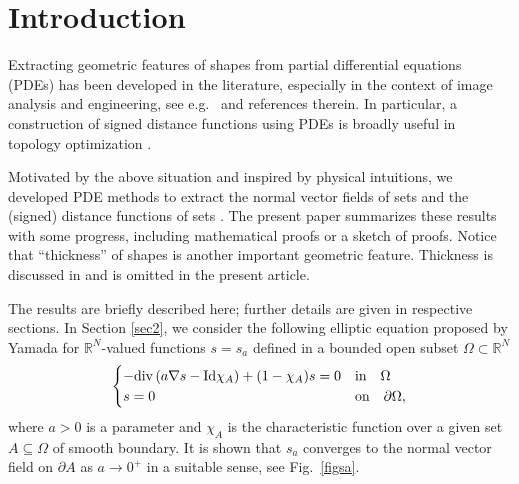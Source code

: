 \documentclass[graybox]{svmult}
\newcommand{\R}{\mathbb{R}}  %
\renewcommand{\AA}{A}  %
\renewcommand{\div}{\mathrm{div}} %
\begin{document}
\section{Introduction}
\label{sec:1}



Extracting geometric features of shapes from partial differential equations (PDEs) has been developed in the literature, especially in the context of image analysis and engineering, see e.g.\ \cite{BF,crane2013geodesics,han2004cortical,yamada2019geometric,yamada2019thickness} and references therein. In particular, a construction of signed distance functions using PDEs is broadly useful in topology optimization \cite{AJT04}. 

Motivated by the above situation and inspired by physical intuitions, we developed PDE methods to extract the normal vector fields of sets \cite{M1} and the (signed) distance functions of sets \cite{M}.  
The present paper summarizes these results with some progress, including mathematical proofs or a sketch of proofs. Notice that ``thickness'' of shapes is another important geometric feature. Thickness is discussed in \cite{NY,yamada2019geometric,yamada2019thickness} and is omitted in the present article.  

The results are briefly described here; further details are given in respective sections. In Section \ref{sec2}, we consider the following elliptic equation  proposed by Yamada \cite{yamada2019geometric,yamada2019thickness}  for $\R^N$-valued functions $s=s_a$ defined in a bounded open subset $\Omega \subset \R^N$
\begin{equation}\label{eq:Yamada}
\begin{cases}
-\div \left(a \nabla s - {\rm Id} \chi_\AA \right)+(1-\chi_\AA)s=0&\text{in} \quad \Omega \\
s =0 & \text{on} \quad \partial\Omega, 
\end{cases}
\end{equation}
where $a>0$ is a parameter and $\chi_\AA$ is the characteristic function over a given set $\AA\subseteq \Omega$ of smooth boundary. 
It is  shown that $s_a$ converges to the normal vector field on $\partial \AA$ as $a\to0^+$ in a suitable sense, see Fig.~\ref{figsa}. 
\end{document}
